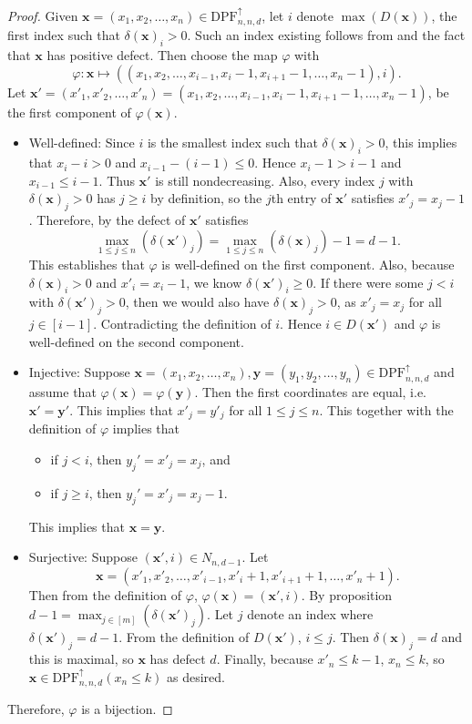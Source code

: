 \documentclass[11pt,reqno]{BICA}
\theoremstyle{definition}
\newcommand{\NDDPF}{\mathrm{DPF}^\uparrow}
\newcommand{\x}{\mathbf{x}}
\newcommand{\y}{\mathbf{y}}
\begin{document}
\begin{proof}
    Given $\x=(x_1,x_2,\ldots,x_n) \in \NDDPF_{n,n,d}$, let $i$ denote $\max(D(\x))$, the first index such that $\delta(\x)_i > 0$. Such an index existing follows from  and the fact that $\x$ has positive defect. Then choose the map $\varphi$ with
    \[\varphi: \x \mapsto ((x_1,x_2,\ldots,x_{i-1},x_{i}-1,x_{i+1}-1,\ldots,x_n-1),i).\]
    Let $\x'=(x'_1,x'_2,\dots,x'_n)=(x_1,x_2,\ldots,x_{i-1},x_{i}-1,x_{i+1}-1,\ldots,x_n-1)$, be the first component of $\varphi(\x)$.

    \begin{itemize}[leftmargin=.2in]
        \item Well-defined: Since $i$ is the smallest index such that 
        $\delta(\x)_i>0$, this implies that $x_i-i>0$ and $x_{i-1}-(i-1)\leq 0$.
        Hence $x_i - 1 > i - 1$ and $x_{i-1} \leq i-1$. Thus $\x'$ is  still nondecreasing. Also, every index $j$ with $\delta(\x)_j > 0$ has $j \geq i$ by definition, so the $j$th entry of $\x'$ satisfies $x'_j=x_j - 1$. 
        Therefore, by  the defect of $\x'$ satisfies \[\max_{1 \leq j \leq n}(\delta(\x')_j) = \max_{1 \leq j \leq n}(\delta(\x)_j) - 1 = d-1.\]
        This establishes that $\varphi$ is well-defined on the first component. 
        Also, because $\delta(\x)_i > 0$ and  $x'_i=x_i-1$, we know $\delta(\x')_i \geq 0$. If there were some $j < i$ with $\delta(\x')_j > 0$, then we would also have $\delta(\x)_j > 0$, as $x'_j=x_j$ for all $j\in[i-1]$. 
        Contradicting the definition of $i$. Hence $i \in D(\x')$ and $\varphi$ is well-defined on the second component.

        \item Injective: Suppose $\x=(x_1,x_2,\ldots,x_n), \y=(y_1,y_2,\ldots,y_n) \in \NDDPF_{n,n,d}$ and assume that $\varphi(\x)=\varphi(\y)$. Then the first coordinates are equal, i.e. $\x'=\y'$. This implies that $x'_j = y'_j$ for all $1 \leq j \leq n$. 
This together with the definition of $\varphi$ implies that
\begin{itemize}
\item if $j < i$, then $y_j'=x'_j=x_j$, and 
\item if  $j \geq i$, then $y_j'=x'_j=x_j-1$.
\end{itemize}

        This implies that $\x = \y$.
        \item Surjective: Suppose $(\x', i) \in N_{n,d-1}$. Let 
        \[\x = (x'_1, x'_2, \ldots, x'_{i-1}, x'_i + 1, x'_{i+1}+1,\ldots, x'_n+1).\]
        Then from the definition of $\varphi$, $\varphi(\x) = (\x', i)$. By proposition  $d - 1 = \max_{j \in [m]}(\delta(\x')_j)$. Let $j$ denote an index where $\delta(\x')_j = d-1$.
        From the definition of $D(\x')$, $i \leq j$. Then $\delta(\x)_j = d$ and this is maximal, so $\x$ has defect $d$. 
        Finally, because $x'_n \leq k-1$, $x_n \leq k$, so $\x \in \NDDPF_{n,n,d}(x_n \leq k)$ as desired.
    \end{itemize}
        Therefore, $\varphi$ is a bijection. 



\end{proof}
\end{document}
